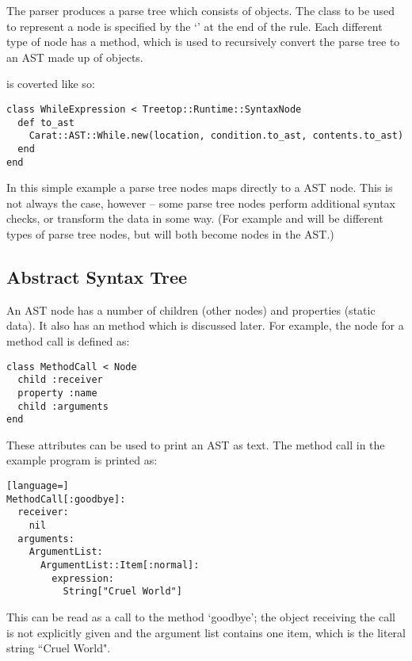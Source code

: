 The parser produces a parse tree which consists of  objects. The class to be used to represent a  node is specified by the `' at the end of the rule. Each different type of node has a  method, which is used to recursively convert the parse tree to an AST made up of  objects.

 is coverted like so:

\begin{lstlisting}
class WhileExpression < Treetop::Runtime::SyntaxNode
  def to_ast
    Carat::AST::While.new(location, condition.to_ast, contents.to_ast)
  end
end
\end{lstlisting}

In this simple example a  parse tree nodes maps directly to a  AST node. This is not always the case, however -- some parse tree nodes perform additional syntax checks, or transform the data in some way. (For example  and  will be different types of parse tree nodes, but will both become  nodes in the AST.)

\subsection{Abstract Syntax Tree}

An AST node has a number of children (other nodes) and properties (static data). It also has an  method which is discussed later. For example, the node for a method call is defined as:

\begin{lstlisting}
class MethodCall < Node
  child :receiver
  property :name
  child :arguments
end
\end{lstlisting}

These attributes can be used to print an AST as text. The method call in the example program is printed as:

\begin{lstlisting}[language=]
MethodCall[:goodbye]:
  receiver:
    nil
  arguments:
    ArgumentList:
      ArgumentList::Item[:normal]:
        expression:
          String["Cruel World"]
\end{lstlisting}

This can be read as a call to the method `goodbye'; the object receiving the call is not explicitly given and the argument list contains one item, which is the literal string ``Cruel World".

